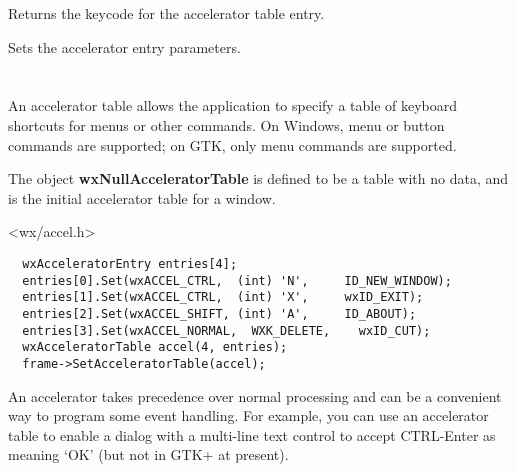 
Returns the keycode for the accelerator table entry.

\label{wxacceleratorentryset}


Sets the accelerator entry parameters.





\section{}\label{wxacceleratortable}

An accelerator table allows the application to specify a table of keyboard shortcuts for
menus or other commands. On Windows, menu or button commands are supported; on GTK,
only menu commands are supported.

The object {\bf wxNullAcceleratorTable} is defined to be a table with no data, and is the
initial accelerator table for a window.




<wx/accel.h>


{\small%
\begin{verbatim}
  wxAcceleratorEntry entries[4];
  entries[0].Set(wxACCEL_CTRL,  (int) 'N',     ID_NEW_WINDOW);
  entries[1].Set(wxACCEL_CTRL,  (int) 'X',     wxID_EXIT);
  entries[2].Set(wxACCEL_SHIFT, (int) 'A',     ID_ABOUT);
  entries[3].Set(wxACCEL_NORMAL,  WXK_DELETE,    wxID_CUT);
  wxAcceleratorTable accel(4, entries);
  frame->SetAcceleratorTable(accel);
\end{verbatim}
}%


An accelerator takes precedence over normal processing and can be a convenient way to program some event handling.
For example, you can use an accelerator table to enable a dialog with a multi-line text control to
accept CTRL-Enter as meaning `OK' (but not in GTK+ at present).

